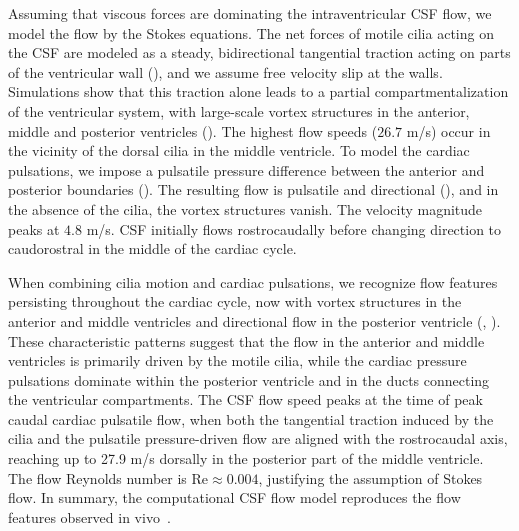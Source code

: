 \documentclass{WileyMSP-template}
\begin{document}
Assuming that viscous forces are dominating the intraventricular CSF flow,
we model the flow by the Stokes equations.
The net forces of motile cilia acting on the CSF are modeled as a steady,
bidirectional tangential traction acting on parts of the ventricular wall
(), and we assume free velocity slip at the walls.
Simulations show that this traction alone
leads to a partial compartmentalization of the ventricular system,
with large-scale vortex structures in the anterior, middle and
posterior ventricles (). The highest flow
speeds ($26.7$ \textmu m/s) occur in the vicinity of the dorsal cilia
in the middle ventricle. To model the cardiac pulsations, we impose a
pulsatile pressure difference between the anterior and posterior
boundaries (). The resulting flow
is pulsatile and directional (), and
in the absence of the cilia, the vortex structures vanish. The
velocity magnitude peaks at $4.8$ \textmu m/s. CSF initially flows
rostrocaudally before changing direction to caudorostral in the middle
of the cardiac cycle.

When combining cilia motion and cardiac pulsations, we recognize flow features
persisting throughout the cardiac cycle, now with vortex structures in
the anterior and middle ventricles and directional flow in the
posterior ventricle (, ). These characteristic patterns suggest that the flow in
the anterior and middle ventricles is primarily driven by the motile
cilia, while the cardiac pressure pulsations dominate within the
posterior ventricle and in the ducts connecting the ventricular
compartments. The CSF flow speed peaks at the time of peak caudal
cardiac pulsatile flow, when both the tangential traction induced by
the cilia and the pulsatile pressure-driven flow are aligned with the
rostrocaudal axis, reaching up to 27.9 \textmu m/s dorsally in the
posterior part of the middle ventricle. The flow Reynolds number is
$\mathrm{Re} \approx 0.004$, justifying the assumption of Stokes
flow. In summary, the computational CSF flow model reproduces the flow
features observed in vivo~\cite{Olstad2019CiliaryDevelopment}.
\end{document}

